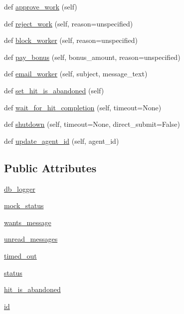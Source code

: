 \begin{DoxyCompactItemize}
\item 
def \hyperlink{classmock__turk__agent_1_1MockTurkAgent_acad647ecc28187f9c2ac6c0da14fcdfb}{approve\+\_\+work} (self)
\item 
def \hyperlink{classmock__turk__agent_1_1MockTurkAgent_af810321a5b91609ddc865815c2481d0a}{reject\+\_\+work} (self, reason=\textquotesingle{}unspecified\textquotesingle{})
\item 
def \hyperlink{classmock__turk__agent_1_1MockTurkAgent_a4c1e39f383bd9a8e02ab8a44365202c8}{block\+\_\+worker} (self, reason=\textquotesingle{}unspecified\textquotesingle{})
\item 
def \hyperlink{classmock__turk__agent_1_1MockTurkAgent_ae909aa8dfbf8f7bb7a08c2a2f4f68fac}{pay\+\_\+bonus} (self, bonus\+\_\+amount, reason=\textquotesingle{}unspecified\textquotesingle{})
\item 
def \hyperlink{classmock__turk__agent_1_1MockTurkAgent_aa71a2a58ed436ab1c9a72f1296406706}{email\+\_\+worker} (self, subject, message\+\_\+text)
\item 
def \hyperlink{classmock__turk__agent_1_1MockTurkAgent_a4584596c414a1e070f7e38d48a2fd87b}{set\+\_\+hit\+\_\+is\+\_\+abandoned} (self)
\item 
def \hyperlink{classmock__turk__agent_1_1MockTurkAgent_a6d4b090cedb00e74f27abf53c703fba6}{wait\+\_\+for\+\_\+hit\+\_\+completion} (self, timeout=None)
\item 
def \hyperlink{classmock__turk__agent_1_1MockTurkAgent_a6537ccd3b9710e277e8c244853a4db2b}{shutdown} (self, timeout=None, direct\+\_\+submit=False)
\item 
def \hyperlink{classmock__turk__agent_1_1MockTurkAgent_ab2713122689bbd255ee58ed367d68aca}{update\+\_\+agent\+\_\+id} (self, agent\+\_\+id)
\end{DoxyCompactItemize}
\subsection*{Public Attributes}
\begin{DoxyCompactItemize}
\item 
\hyperlink{classmock__turk__agent_1_1MockTurkAgent_a7bf5a827ac190c37e605ffa7d69f6a6e}{db\+\_\+logger}
\item 
\hyperlink{classmock__turk__agent_1_1MockTurkAgent_ab48e624c7741dc04458634c719e19074}{mock\+\_\+status}
\item 
\hyperlink{classmock__turk__agent_1_1MockTurkAgent_a0ea3932c7ae85ec75406e29447ecff68}{wants\+\_\+message}
\item 
\hyperlink{classmock__turk__agent_1_1MockTurkAgent_af9f67f7197cf6c55acece21deb12b10c}{unread\+\_\+messages}
\item 
\hyperlink{classmock__turk__agent_1_1MockTurkAgent_a8481779cac127832fa6aa91bb92f4ffd}{timed\+\_\+out}
\item 
\hyperlink{classmock__turk__agent_1_1MockTurkAgent_a7832b915d19a906ebcdbc6bc81319059}{status}
\item 
\hyperlink{classmock__turk__agent_1_1MockTurkAgent_af095850c16880742d57d06ee4a6012c4}{hit\+\_\+is\+\_\+abandoned}
\item 
\hyperlink{classmock__turk__agent_1_1MockTurkAgent_af82e21ecd7246741aa92bf4a01982984}{id}
\end{DoxyCompactItemize}
